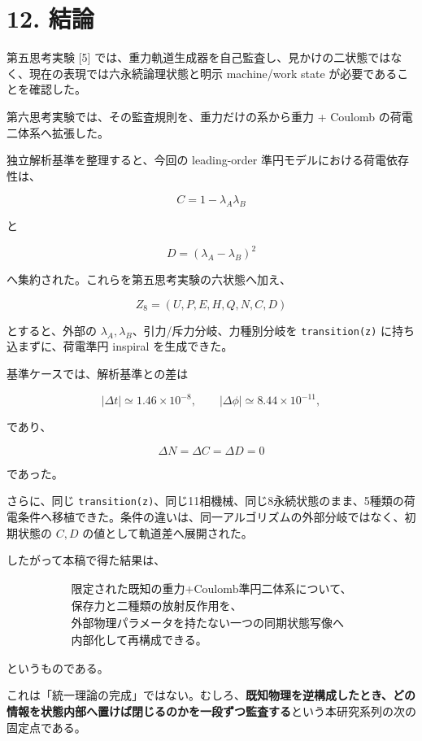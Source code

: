 \documentclass[
  a4paper,
]{ltjsarticle}
\begin{document}
\section{12. 結論}\label{ux7d50ux8ad6}

第五思考実験 {[}5{]}
では、重力軌道生成器を自己監査し、見かけの二状態ではなく、現在の表現では六永続論理状態と明示
machine/work state が必要であることを確認した。

第六思考実験では、その監査規則を、重力だけの系から重力 + Coulomb
の荷電二体系へ拡張した。

独立解析基準を整理すると、今回の leading-order
準円モデルにおける荷電依存性は、

\[
C=1-\lambda_A\lambda_B
\]

と

\[
D=(\lambda_A-\lambda_B)^2
\]

へ集約された。これらを第五思考実験の六状態へ加え、

\[
\boxed{
Z_8=(U,P,E,H,Q,N,C,D)
}
\]

とすると、外部の \(\lambda_A,\lambda_B\)、引力/斥力分岐、力種別分岐を
\texttt{transition(z)} に持ち込まずに、荷電準円 inspiral を生成できた。

基準ケースでは、解析基準との差は

\[
|\Delta t|\simeq1.46\times10^{-8},
\qquad
|\Delta\phi|\simeq8.44\times10^{-11},
\]

であり、

\[
\Delta N=\Delta C=\Delta D=0
\]

であった。

さらに、同じ
\texttt{transition(z)}、同じ11相機械、同じ8永続状態のまま、5種類の荷電条件へ移植できた。条件の違いは、同一アルゴリズムの外部分岐ではなく、初期状態の
\(C,D\) の値として軌道差へ展開された。

したがって本稿で得た結果は、

\[
\boxed{
\begin{array}{c}
\text{限定された既知の重力+Coulomb準円二体系について、}\\
\text{保存力と二種類の放射反作用を、}\\
\text{外部物理パラメータを持たない一つの同期状態写像へ}\\
\text{内部化して再構成できる。}
\end{array}
}
\]

というものである。

これは「統一理論の完成」ではない。むしろ、\textbf{既知物理を逆構成したとき、どの情報を状態内部へ置けば閉じるのかを一段ずつ監査する}という本研究系列の次の固定点である。
\end{document}
